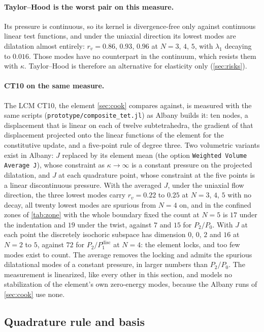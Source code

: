 \documentclass{article}
\newcommand{\code}[1]{\texttt{#1}}
\theoremstyle{definition}
\theoremstyle{plain}
\begin{document}
\paragraph{Taylor--Hood is the worst pair on this measure.} Its pressure is
continuous, so its kernel is divergence-free only against continuous linear
test functions, and under the uniaxial direction its lowest modes are
dilatation almost entirely: $r_v = 0.86$, $0.93$, $0.96$ at $N = 3$, $4$, $5$,
with $\lambda_1$ decaying to $0.016$. Those modes have no counterpart in the
continuum, which resists them with $\kappa$. Taylor--Hood is therefore an
alternative for elasticity only (\cref{sec:risks}).

\paragraph{CT10 on the same measure.} The LCM CT10, the element \cref{sec:cook} compares against,
is measured with the same scripts (\code{prototype/composite\_tet.jl}) as
Albany builds it: ten nodes, a displacement that is linear on each of
twelve subtetrahedra, the gradient of that displacement projected onto the
linear functions of the element for the constitutive update, and a
five-point rule of degree three. Two volumetric variants exist in Albany:
$J$ replaced by its element mean (the option \code{Weighted Volume Average J}),
whose constraint as $\kappa \to \infty$ is a constant pressure on the
projected dilatation, and $J$ at each quadrature point, whose constraint at
the five points is a linear discontinuous pressure. With the averaged $J$,
under the uniaxial flow direction, the three lowest modes carry $r_v = 0.22$
to $0.25$ at $N = 3$, $4$, $5$ with no decay, all twenty lowest modes are
spurious from $N = 4$ on, and in the confined zones of \cref{tab:zone}
with the whole boundary fixed the count at $N = 5$ is $17$ under the
indentation and $19$ under the twist, against $7$ and $15$ for $P_2/P_0$.
With $J$ at each point the discretely isochoric subspace has dimension $0$,
$0$, $2$ and $16$ at $N = 2$ to $5$, against $72$ for $P_2/P_1^{\mathrm{disc}}$
at $N = 4$: the element locks, and too few modes exist to count. The
average removes the locking and admits the spurious dilatational modes of a
constant pressure, in larger numbers than $P_2/P_0$. The measurement is
linearized, like every other in this section, and models no stabilization
of the element's own zero-energy modes, because the Albany runs of
\cref{sec:cook} use none.


\subsection{Quadrature rule and basis}
\label{sec:basis}
\end{document}
